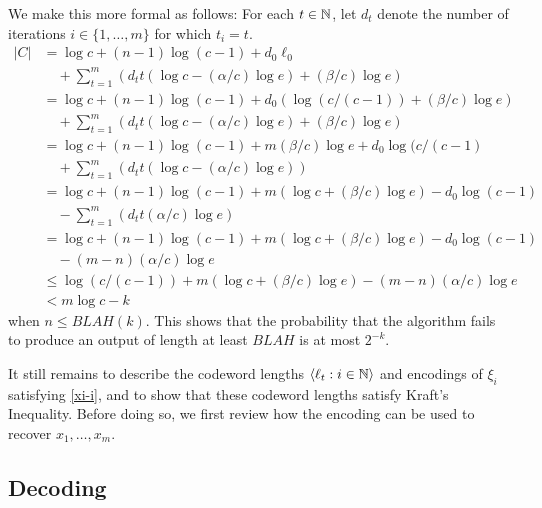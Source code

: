 \documentclass{patmorin}
\begin{document}
We make this more formal as follows:  For each $t\in\mathbb{N}$, let $d_t$ denote the number of iterations $i\in\{1,\ldots,m\}$ for which $t_i=t$. 
\begin{align*}
    |C| 
    & = \log c + (n-1)\log(c-1) + d_0\ell_0 \\ 
      & \quad {} + \sum_{t=1}^m \left(d_t t(\log c - (\alpha/c)\log e) + (\beta/c)\log e\right) \\
    & = \log c + (n-1)\log(c-1) + d_0(\log(c/(c-1))+(\beta/c)\log e) \\ 
      & \quad {} + \sum_{t=1}^m \left(d_t t(\log c - (\alpha/c)\log e) + (\beta/c)\log e\right) \\
    & = \log c + (n-1)\log(c-1) + m(\beta/c)\log e + d_0\log(c/(c-1) \\ 
      & \quad {} + \sum_{t=1}^m \left(d_t t(\log c - (\alpha/c)\log e) \right) \\
    & = \log c + (n-1)\log(c-1) + m(\log c + (\beta/c)\log e) - d_0\log(c-1) \\
      & \quad {} - \sum_{t=1}^m \left(d_t t(\alpha/c)\log e \right) \\
    & = \log c + (n-1)\log(c-1) + m(\log c + (\beta/c)\log e) - d_0\log(c-1) \\ 
      & \quad {} - (m-n)(\alpha/c)\log e \\
    & \le \log (c/(c-1)) + m(\log c + (\beta/c)\log e) - (m-n)(\alpha/c)\log e \\
    & < m\log c - k
\end{align*}
when $n \le BLAH(k)$.  This shows that the probability that the algorithm fails to produce an output of length at least $BLAH$ is at most $2^{-k}$.

It still remains to describe the codeword lengths $\langle \ell_t:i\in \mathbb{N}\rangle$ and encodings of $\xi_i$ satisfying \eqref{xi-i}, and to show that these codeword lengths satisfy Kraft's Inequality.  Before doing so, we first review how the encoding can be used to recover $x_1,\ldots,x_m$.


\subsection{Decoding}
\end{document}
